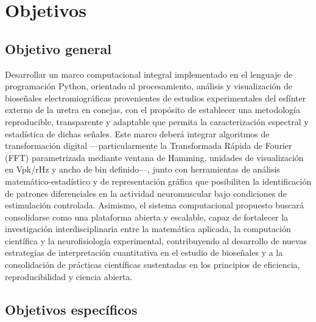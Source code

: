 \section{Objetivos}

\subsection{Objetivo general}

\noindent Desarrollar un marco computacional integral implementado en el lenguaje de programación Python, orientado al procesamiento, análisis y visualización de bioseñales electromiográficas provenientes de estudios experimentales del esfínter externo de la uretra en conejas, con el propósito de establecer una metodología reproducible, transparente y adaptable que permita la caracterización espectral y estadística de dichas señales. Este marco deberá integrar algoritmos de transformación digital —particularmente la Transformada Rápida de Fourier (FFT) parametrizada mediante ventana de Hamming, unidades de visualización en Vpk/rHz y ancho de bin definido—, junto con herramientas de análisis matemático-estadístico y de representación gráfica que posibiliten la identificación de patrones diferenciales en la actividad neuromuscular bajo condiciones de estimulación controlada. Asimismo, el sistema computacional propuesto buscará consolidarse como una plataforma abierta y escalable, capaz de fortalecer la investigación interdisciplinaria entre la matemática aplicada, la computación científica y la neurofisiología experimental, contribuyendo al desarrollo de nuevas estrategias de interpretación cuantitativa en el estudio de bioseñales y a la consolidación de prácticas científicas sustentadas en los principios de eficiencia, reproducibilidad y ciencia abierta.

\subsection{Objetivos específicos}

